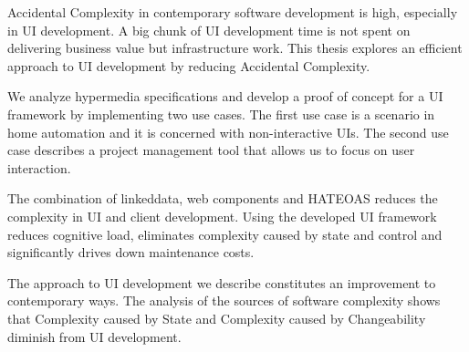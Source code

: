 Accidental Complexity in contemporary software development is high, especially in UI development. A big chunk of UI development time is not spent on delivering business value but infrastructure work. This thesis explores an efficient approach to UI development by reducing Accidental Complexity.

We analyze \gls{hypermedia} specifications and develop a proof of concept for a UI framework by implementing two use cases. The first use case is a scenario in home automation and it is concerned with non-interactive UIs. The second use case describes a project management tool that allows us to focus on user interaction.

The combination of \gls{linkeddata}, web components and HATEOAS reduces the complexity in UI and client development. Using the developed UI framework reduces cognitive load, eliminates complexity caused by state and control and significantly drives down maintenance costs.

The approach to UI development we describe constitutes an improvement to contemporary ways. The analysis of the sources of software complexity shows that Complexity caused by State and Complexity caused by Changeability diminish from UI development.
